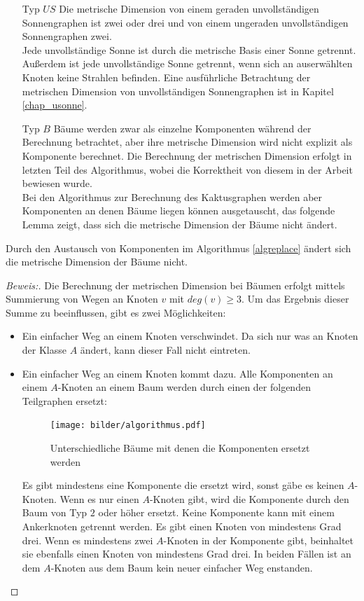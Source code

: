 \begin{itemize}
\item[Typ $US$]
Die metrische Dimension von einem geraden unvollständigen Sonnengraphen ist zwei oder drei und von einem ungeraden unvollständigen Sonnengraphen zwei.\\
Jede unvollständige Sonne ist durch die metrische Basis einer Sonne getrennt. Außerdem ist jede unvollständige Sonne getrennt, wenn sich an auserwählten Knoten keine Strahlen befinden. Eine ausführliche Betrachtung der metrischen Dimension von unvollständigen Sonnengraphen ist in Kapitel \ref{chap_usonne}.
\item[Typ $B$]
Bäume werden zwar als einzelne Komponenten während der Berechnung betrachtet, aber ihre metrische Dimension wird nicht explizit als Komponente berechnet. Die Berechnung der metrischen Dimension erfolgt in letzten Teil des Algorithmus, wobei die Korrektheit von diesem in der Arbeit \cite{landmarks} bewiesen wurde.\\
Bei den Algorithmus zur Berechnung des Kaktusgraphen werden aber Komponenten an denen Bäume liegen können ausgetauscht, das folgende Lemma zeigt, dass sich die metrische Dimension der Bäume nicht ändert.
\end{itemize}
\begin{lem}
Durch den Austausch von Komponenten im Algorithmus \ref{algreplace} ändert sich die metrische Dimension der Bäume nicht.
\end{lem}
\begin{proof}[Beweis:]
Die Berechnung der metrischen Dimension bei Bäumen erfolgt mittels Summierung von Wegen an Knoten $v$ mit $deg(v)\geq 3$. Um das Ergebnis dieser Summe zu beeinflussen, gibt es zwei Möglichkeiten:
\begin{itemize}
\item Ein einfacher Weg an einem Knoten verschwindet.
Da sich nur was an Knoten der Klasse $A$ ändert, kann dieser Fall nicht eintreten. 
\item Ein einfacher Weg an einem Knoten kommt dazu. Alle Komponenten an einem $A$-Knoten an einem Baum werden durch einen der folgenden Teilgraphen ersetzt:
\vspace{-4mm}
\begin{figure}[h!]
		\centering 		 
   \texttt{[image: bilder/algorithmus.pdf]}
	\caption{Unterschiedliche Bäume mit denen die Komponenten ersetzt werden}
  	 \end{figure}
Es gibt mindestens eine Komponente die ersetzt wird, sonst gäbe es keinen $A$-Knoten. Wenn es nur einen $A$-Knoten gibt, wird die Komponente durch den Baum von Typ $2$ oder höher ersetzt. Keine Komponente kann mit einem Ankerknoten getrennt werden. Es gibt einen Knoten von mindestens Grad drei. Wenn es mindestens zwei $A$-Knoten in der Komponente gibt, beinhaltet sie ebenfalls einen Knoten von mindestens Grad drei. In beiden Fällen ist an dem $A$-Knoten aus dem Baum kein neuer einfacher Weg enstanden.
\end{itemize}
\end{proof}
\vspace{-8mm}
